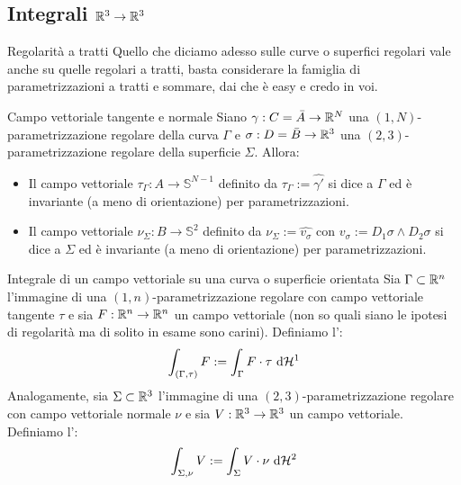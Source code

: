 \documentclass{article}
\begin{document}
\subsection{Integrali $\mathbb{R}^3 \to \mathbb{R}^3$}

\begin{remark}{Regolarità a tratti}{}
    Quello che diciamo adesso sulle curve o superfici regolari vale anche su quelle regolari a tratti, basta considerare la famiglia di parametrizzazioni a tratti e sommare, dai che è easy e credo in voi.
\end{remark}

\begin{definition}{Campo vettoriale tangente e normale}{}
    Siano $\gamma : C = \bar{A} \to \mathbb{R}^N$ una $(1,N)$-parametrizzazione regolare della curva $\Gamma$ e $\sigma : D = \bar{B} \to \mathbb{R}^3$ una $(2,3)$-parametrizzazione regolare della superficie $\Sigma$. Allora:\begin{itemize}
        \item Il campo vettoriale $\tau_\Gamma : A \to \mathbb{S}^{N-1}$ definito da $\tau_\Gamma := \hat{\gamma'}$ si dice  a $\Gamma$ ed è invariante (a meno di orientazione) per parametrizzazioni.
        \item Il campo vettoriale $\nu_\Sigma : B \to \mathbb{S}^2$ definito da $\nu_\Sigma := \hat{v_\sigma}$ con $ v_\sigma := D_1 \sigma \wedge D_2 \sigma$ si dice  a $\Sigma$ ed è invariante (a meno di orientazione) per parametrizzazioni.
    \end{itemize}
\end{definition}

\begin{definition}{Integrale di un campo vettoriale su una curva o superficie orientata}{}
    Sia $\Gamma \subset \mathbb{R}^n$ l'immagine di una $(1,n)$-parametrizzazione regolare con campo vettoriale tangente $\tau$ e sia $F: \mathbb{R}^n \to \mathbb{R}^n$ un campo vettoriale (non so quali siano le ipotesi di regolarità ma di solito in esame sono carini). Definiamo l':
    \[\int_{(\Gamma,\tau)} F := \int_\Gamma F \cdot \tau \text{ d} \mathcal{H}^1\]   
    Analogamente, sia $\Sigma \subset \mathbb{R}^3$ l'immagine di una $(2,3)$-parametrizzazione regolare con campo vettoriale normale $\nu$ e sia $V : \mathbb{R}^3 \to \mathbb{R}^3$ un campo vettoriale. Definiamo l':
    \[\int_{\Sigma,\nu} V := \int_\Sigma V \cdot \nu \text{ d} \mathcal{H}^2\]
\end{definition}
\end{document}

